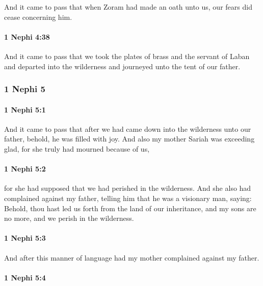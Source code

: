 			And it came to pass that when Zoram had made an oath unto us,
			our fears did cease concerning him.

		\paragraph{1 Nephi 4:38} %
			\label{1NEPHI-4-38}

			And it came to pass that we took the plates of brass and the servant of Laban
			and departed into the wilderness and journeyed unto the tent of our father.
			
	\subsubsection{1 Nephi 5} %
		\label{1NEPHI-5}

		\paragraph{1 Nephi 5:1} %
			\label{1NEPHI-5-1}

			And it came to pass that after we had came down
			into the wilderness unto our father,
			behold, he was filled with joy.
			And also my mother Sariah was exceeding glad,
			for she truly had mourned because of us,

		\paragraph{1 Nephi 5:2} %
			\label{1NEPHI-5-2}

			for she had supposed that we had perished in the wilderness.
			And she also had complained against my father,
			telling him that he was a visionary man, saying:
			Behold, thou hast led us forth from the land of our inheritance,
			and my sons are no more, and we perish in the wilderness.

		\paragraph{1 Nephi 5:3} %
			\label{1NEPHI-5-3}

			And after this manner of language had my mother complained against my father.

		\paragraph{1 Nephi 5:4} %
			\label{1NEPHI-5-4}

